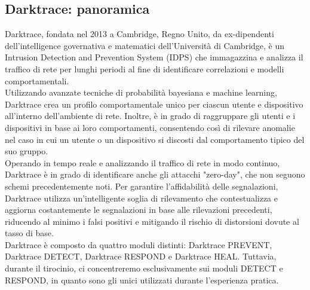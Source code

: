 \documentclass[12pt,a4paper,oneside,onecolumn,openright]{book}
\begin{document}
	\subsection{Darktrace: panoramica}
	Darktrace, fondata nel 2013 a Cambridge, Regno Unito, da ex-dipendenti dell'intelligence governativa e matematici dell'Università di Cambridge, è un Intrusion Detection and Prevention System (IDPS) che immagazzina e analizza il traffico di rete per lunghi periodi al fine di identificare correlazioni e modelli comportamentali.\\
	Utilizzando avanzate tecniche di probabilità bayesiana e machine learning, Darktrace crea un profilo comportamentale unico per ciascun utente e dispositivo all'interno dell'ambiente di rete. Inoltre, è in grado di raggruppare gli utenti e i dispositivi in base ai loro comportamenti, consentendo così di rilevare anomalie nel caso in cui un utente o un dispositivo si discosti dal comportamento tipico del suo gruppo.\\
	Operando in tempo reale e analizzando il traffico di rete in modo continuo, Darktrace è in grado di identificare anche gli attacchi "zero-day", che non seguono schemi precedentemente noti. Per garantire l'affidabilità delle segnalazioni, Darktrace utilizza un'intelligente soglia di rilevamento che contestualizza e aggiorna costantemente le segnalazioni in base alle rilevazioni precedenti, riducendo al minimo i falsi positivi e mitigando il rischio di distorsioni dovute al tasso di base.\\
	Darktrace è composto da quattro moduli distinti: Darktrace PREVENT, Darktrace DETECT, Darktrace RESPOND e Darktrace HEAL. Tuttavia, durante il tirocinio, ci concentreremo esclusivamente sui moduli DETECT e RESPOND, in quanto sono gli unici utilizzati durante l'esperienza pratica.\cite{threat1}
	
\end{document}
